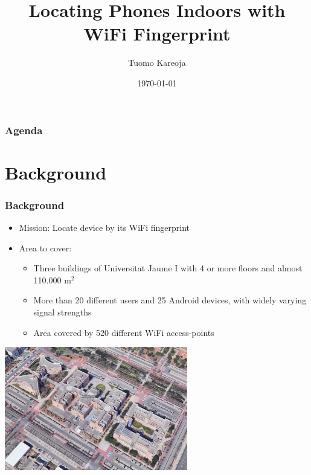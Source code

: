 \documentclass[10pt]{beamer}
\title[Indoor Locationing?]{Locating Phones Indoors with WiFi Fingerprint} %
\author{Tuomo Kareoja} %
\institute[IOT Analytics] %
{
IOT Analytics \\ %
\medskip
}
\date{\today} %
\begin{document}
\begin{frame}
\titlepage %
\end{frame}

\begin{frame}
\frametitle{Agenda} %
\tableofcontents %
\end{frame}


\section{Background}

\begin{frame}
\frametitle{
    Background
}

\begin{itemize}
    \item Mission: Locate device by its WiFi fingerprint
    \item Area to cover:
    \begin{itemize}
        \item Three buildings of Universitat Jaume I with 4 or more floors and almost 110.000 m\(^2\)
        \item More than 20 different users and 25 Android devices, with widely varying signal strengths
        \item Area covered by 520 different WiFi access-points
    \end{itemize}
\end{itemize}


{
    \centering
    \includegraphics[width=8cm,keepaspectratio]{university_campus_gmaps.png}
    \par
}

\end{frame}
\end{document}
